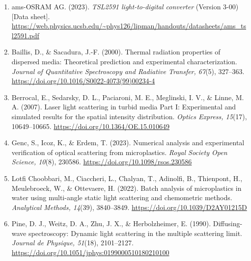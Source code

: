 \sloppy
\begin{enumerate}[label={}, leftmargin=2em, itemsep=0.6em]
    \item ams-OSRAM AG. (2023). \textit{TSL2591 light-to-digital converter} (Version 3-00) [Data sheet]. \url{https://web.physics.ucsb.edu/~phys126/lipman/handouts/datasheets/ams_tsl2591.pdf}
    \item Baillis, D., \& Sacadura, J.-F. (2000). Thermal radiation properties of dispersed media: Theoretical prediction and experimental characterization. \textit{Journal of Quantitative Spectroscopy and Radiative Transfer, 67}(5), 327--363. \url{https://doi.org/10.1016/S0022-4073(99)00234-4}
    \item Berrocal, E., Sedarsky, D. L., Paciaroni, M. E., Meglinski, I. V., \& Linne, M. A. (2007). Laser light scattering in turbid media Part I: Experimental and simulated results for the spatial intensity distribution. \textit{Optics Express, 15}(17), 10649--10665. \url{https://doi.org/10.1364/OE.15.010649}
    \item Genc, S., Icoz, K., \& Erdem, T. (2023). Numerical analysis and experimental verification of optical scattering from microplastics. \textit{Royal Society Open Science, 10}(8), 230586. \url{https://doi.org/10.1098/rsos.230586}
    \item Lotfi Choobbari, M., Ciaccheri, L., Chalyan, T., Adinolfi, B., Thienpont, H., Meulebroeck, W., \& Ottevaere, H. (2022). Batch analysis of microplastics in water using multi-angle static light scattering and chemometric methods. \textit{Analytical Methods, 14}(39), 3840--3849. \url{https://doi.org/10.1039/D2AY01215D}
    \item Pine, D. J., Weitz, D. A., Zhu, J. X., \& Herbolzheimer, E. (1990). Diffusing-wave spectroscopy: Dynamic light scattering in the multiple scattering limit. \textit{Journal de Physique, 51}(18), 2101--2127. \url{https://doi.org/10.1051/jphys:0199000510180210100}
\end{enumerate}
